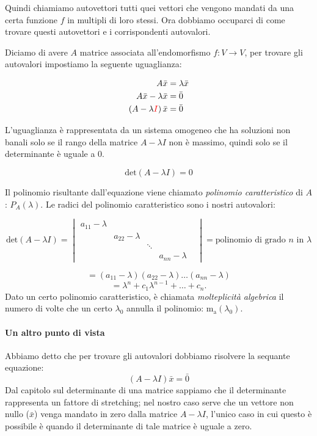 \documentclass[x11names]{article}
\begin{document}
Quindi chiamiamo autovettori tutti quei vettori che vengono mandati da una certa funzione $f$ in multipli di loro stessi. Ora dobbiamo occuparci di come trovare questi autovettori e i corrispondenti autovalori. 

\noindent
Diciamo di avere $A$ matrice associata all'endomorfismo  $f:V \rightarrow V$, per trovare gli autovalori impostiamo la seguente uguaglianza: 

\begin{align*}
A\bar{x} &= \lambda \bar{x} \\
A\bar{x} - \lambda \bar{x} &= \bar{0}\\
\left(A - \lambda \textcolor{red}{I}\right)\bar{x} &= \bar{0} 
\end{align*}

L'uguaglianza è rappresentata da un sistema omogeneo che ha soluzioni non banali solo se il rango della matrice $A-\lambda I$ non è massimo, quindi solo se il determinante è uguale a $0$.

\[
\text{det}\left(A - \lambda I\right) = 0
\] 

\noindent
Il polinomio risultante dall'equazione viene chiamato \textit{polinomio caratteristico} di $A$:  $P_{A}\left(\lambda\right)$. Le radici del polinomio caratteristico sono i nostri autovalori:

 \[
\text{det}\left(A-\lambda I\right) = \begin{vmatrix}
     a_{11}-\lambda &  &  & \\
     & a_{22}-\lambda &  & \\
     &  & \ddots&  & \\
     & &  & a_{nn}-\lambda 
\end{vmatrix}
= \text{polinomio di grado }n \text{ in } \lambda
\] 

\[
= \left(a_{11} - \lambda\right)\left(a_{22}-\lambda\right)\dots\left(a_{nn}-\lambda\right)
\] 
\[
= \lambda^n + c_{1}\lambda^{n-1} + \dots + c_{n} 
.\] 
\noindent
Dato un certo polinomio caratteristico, è chiamata \textit{molteplicità algebrica} il numero di volte che un certo $\lambda_{0}$ annulla il polinomio: $\text{m}_{\text{a}}\left(\lambda_{0}\right)$.

\paragraph{Un altro punto di vista} Abbiamo detto che per trovare gli autovalori dobbiamo risolvere la sequante equazione:
\[
	\left(A - \lambda I \right)\bar{x} = \bar{0}
\] 
Dal capitolo sul determinante di una matrice sappiamo che il determinante rappresenta un fattore di stretching; nel nostro caso serve che un vettore non nullo ($\bar{x}$) venga mandato in zero dalla matrice $A - \lambda I$, l'unico caso in cui questo è possibile è quando il determinante di tale matrice è uguale a zero.
\end{document}
